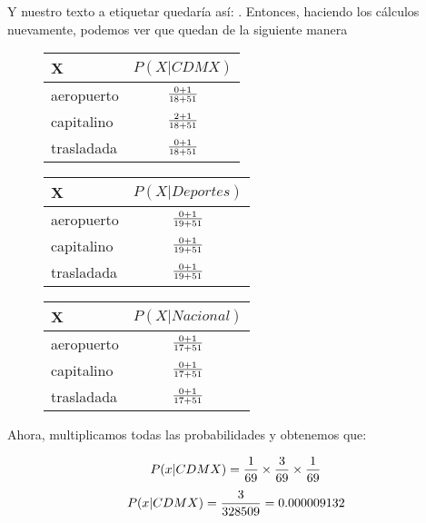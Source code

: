 Y nuestro texto a etiquetar quedaría así: . Entonces, haciendo los cálculos nuevamente, podemos ver que quedan de la siguiente manera

\begin{figure}[H]
  \begin{center}
    \begin{tabular}{ l | c }
      X & $P(X|CDMX)$ \\ \hline
      aeropuerto & $0 + 1 \over {18 + 51}$ \\ \hline
      capitalino & $2 + 1 \over {18 + 51}$ \\ \hline
      trasladada & $0 + 1 \over {18 + 51}$ \\
    \end{tabular}
  \end{center}
\end{figure}

\begin{figure}[H]
  \begin{center}
    \begin{tabular}{ l | c }
      X & $P(X|Deportes)$ \\ \hline
      aeropuerto & $0 + 1 \over {19 + 51}$ \\ \hline
      capitalino & $0 + 1 \over {19 + 51}$ \\ \hline
      trasladada & $0 + 1 \over {19 + 51}$ \\
    \end{tabular}
  \end{center}
\end{figure}

\begin{figure}[H]
  \begin{center}
    \begin{tabular}{ l | c }
      X & $P(X|Nacional)$ \\ \hline
      aeropuerto & $0 + 1 \over {17 + 51}$ \\ \hline
      capitalino & $0 + 1 \over {17 + 51}$ \\ \hline
      trasladada & $0 + 1 \over {17 + 51}$ \\
    \end{tabular}
  \end{center}
\end{figure}

Ahora, multiplicamos todas las probabilidades y obtenemos que: 

\[ P(x | CDMX) = {1 \over 69} \times {3 \over 69} \times {1 \over 69} \]
\[ P(x | CDMX) = { 3 \over 328509} = 0.000009132 \]

